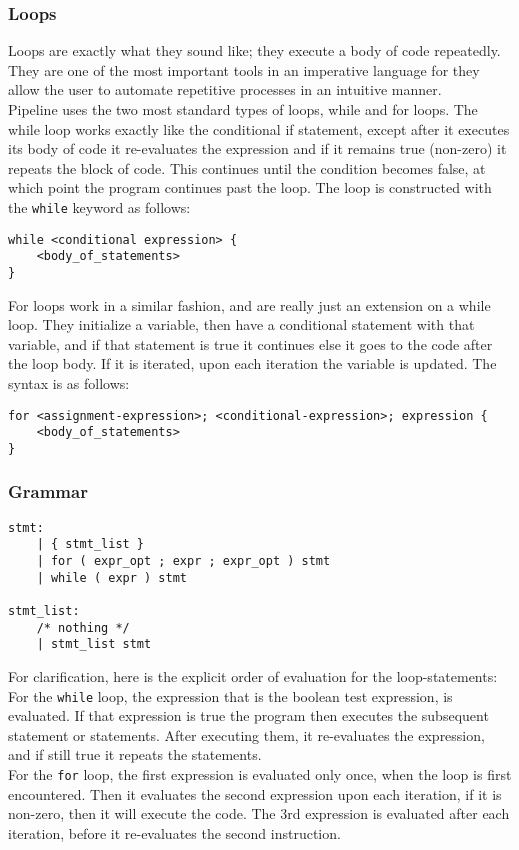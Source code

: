 \documentclass[./LRM_main.tex]{subfiles}
\begin{document}
\subsubsection{Loops}
Loops are exactly what they sound like; they execute a body of code repeatedly. They are one of the most important tools in an imperative language for they allow the user to automate repetitive processes in an intuitive manner.\\
Pipeline uses the two most standard types of loops, while and for loops. The while loop works exactly like the conditional if statement, except after it executes its body of code it re-evaluates the expression and if it remains true (non-zero) it repeats the block of code. This continues until the condition becomes false, at which point the program continues past the loop. The loop is constructed with the \texttt{while} keyword as follows:
\begin{lstlisting}
while <conditional expression> {
	<body_of_statements>
}
\end{lstlisting}
For loops work in a similar fashion, and are really just an extension on a while loop. They initialize a variable, then have a conditional statement with that variable, and if that statement is true it continues else it goes to the code after the loop body. If it is iterated, upon each iteration the variable is updated. The syntax is as follows:
\begin{lstlisting}
for <assignment-expression>; <conditional-expression>; expression {
	<body_of_statements>
}
\end{lstlisting}
\subsubsection{Grammar}
\begin{lstlisting}
stmt:
	| { stmt_list }
    | for ( expr_opt ; expr ; expr_opt ) stmt
    | while ( expr ) stmt     
    
stmt_list:
    /* nothing */  
    | stmt_list stmt
\end{lstlisting}
For clarification, here is the explicit order of evaluation for the loop-statements:\\
For the \texttt{while} loop, the expression that is the boolean test expression, is evaluated. If that expression is true the program then executes the subsequent statement or statements. After executing them, it re-evaluates the expression, and if still true it repeats the statements.\\
For the \texttt{for} loop, the first expression is evaluated only once, when the loop is first encountered. Then it evaluates the second expression upon each iteration, if it is non-zero, then it will execute the code. The 3rd expression is evaluated after each iteration, before it re-evaluates the second instruction.
\end{document}
